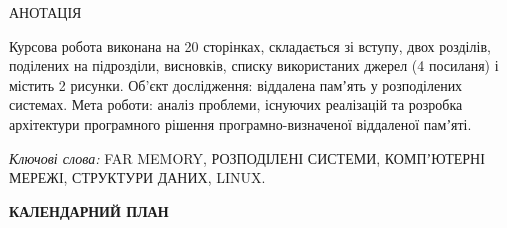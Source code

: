 \begin{center}
АНОТАЦІЯ\\
\end{center}


\sloppy
Курсова робота виконана на 20 сторінках,  складається зі вступу, двох розділів, поділених на підрозділи, висновків, списку використаних джерел (4 посиланя) і містить 2 рисунки. Об’єкт дослідження: віддалена памʼять у розподілених системах. Мета роботи: аналіз проблеми, існуючих реалізацій та розробка архітектури програмного рішення програмно-визначеної віддаленої памʼяті.

\textit{Ключові слова:} FAR MEMORY, РОЗПОДІЛЕНІ СИСТЕМИ, КОМПʼЮТЕРНІ МЕРЕЖІ, СТРУКТУРИ ДАНИХ, LINUX.

\thispagestyle{empty}

\pagebreak

\begin{center}
\fontsize{18}{22}\selectfont
\textbf{КАЛЕНДАРНИЙ ПЛАН}
\end{center}

\thispagestyle{empty}

